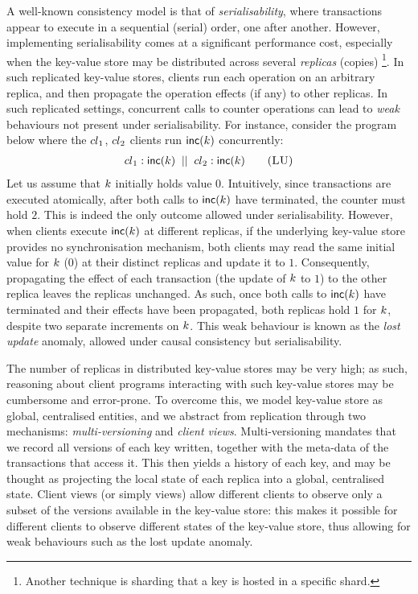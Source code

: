 A well-known consistency model is that of \emph{serialisability}, where transactions appear to execute in a sequential (serial) order, one after another. 
However, implementing serialisability comes at a significant performance cost, 
especially when the key-value store may be distributed across several \emph{replicas} (copies)%
\footnote{Another technique is sharding that a key is hosted in a specific shard.}. 
In such replicated key-value stores, clients run each operation on an arbitrary replica, 
and then propagate the operation effects (if any) to other replicas.
In such replicated settings, concurrent calls to counter operations can lead to \emph{weak} behaviours not present under serialisability. 
For instance, consider the program below where the ${cl}_1$, ${cl}_2$ clients run $\mathsf{inc}(k)$ concurrently: 
\begin{align}
	\cl_1: \ctrinc(\ke)
	\;\; || \;\;
	\cl_2: \ctrinc(\ke)
	\tag{\textsc{LU}}
	\label{prog:inc2}
\end{align}
Let us assume that  $k$ initially holds value $0$.
Intuitively, since transactions are executed atomically, after both calls to $\mathsf{inc}(k)$ have terminated, the counter must hold $2$.
This is indeed the only outcome allowed under serialisability. 
However, when clients execute $\mathsf{inc}(k)$ at different replicas, 
if the underlying key-value store provides no synchronisation mechanism, 
both clients may read the same initial value for $k$ ($0$) at their distinct replicas and update it to $1$. 
Consequently, propagating the effect of each transaction (\ie the update of $k$ to $1$) to the other replica leaves the replicas unchanged. 
As such, once both calls to $\mathsf{inc}(k)$ have terminated and their effects have been propagated, 
both replicas hold $1$ for $k$, 
despite two separate increments on $k$. 
This weak behaviour is known as the \emph{lost update} anomaly, allowed under causal consistency but serialisability. 

The number of replicas in distributed key-value stores may be very high; 
as such, reasoning about client programs interacting with such key-value 
stores may be cumbersome and error-prone. 
To overcome this, we model key-value store as global, centralised entities, and 
we abstract from replication through two mechanisms: \emph{multi-versioning} and \emph{client views}. 
Multi-versioning mandates that we record all versions of each key written, 
together with the meta-data of the transactions that access it. 
This then yields a history of each key, and may be thought as projecting the local state of each replica into a global, centralised state. 
Client views (or simply views) allow different clients to observe only a subset of the versions available in 
the key-value store: this makes it possible for different clients to observe different states 
of the key-value store, thus allowing for weak behaviours such as the lost update anomaly. 

